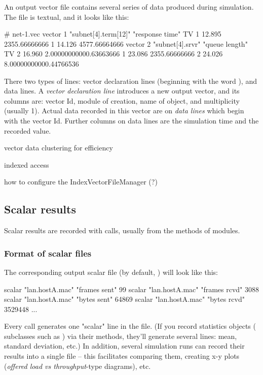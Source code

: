 An output vector file contains several
series of data produced during simulation. The file is textual, and it
looks like this:

\begin{filelisting}
# net-1.vec
vector 1   "subnet[4].term[12]"  "response time"  TV
1  12.895  2355.66666666
1  14.126  4577.66664666
vector 2   "subnet[4].srvr"  "queue length"  TV
2  16.960  2.00000000000.63663666
1  23.086  2355.66666666
2  24.026  8.00000000000.44766536
\end{filelisting}

There two types of lines: vector declaration lines (beginning with
the word ), and data lines.
A \textit{vector declaration line} introduces a new output vector, and
its columns are: vector Id, module of creation, name of 
object, and multiplicity (usually 1). Actual data recorded in this
vector are on \textit{data lines} which begin with the vector Id.
Further columns on data lines are the simulation time and the recorded value.

vector data clustering for efficiency

indexed access

how to configure the IndexVectorFileManager (?)


\subsection{Scalar results}
\label{sec:ch-ana-sim:output-scalars}

Scalar results are recorded with  calls,
usually from the  methods of modules.


\subsubsection{Format of scalar files}

The corresponding output scalar file (by default, )
will look like this:

\begin{filelisting}
scalar "lan.hostA.mac" "frames sent"                99
scalar "lan.hostA.mac" "frames rcvd"                3088
scalar "lan.hostA.mac" "bytes sent"                 64869
scalar "lan.hostA.mac" "bytes rcvd"                 3529448
...
\end{filelisting}

Every  call generates one "scalar" line in the file.
(If you record statistics objects ( subclasses
such as ) via their  methods,
they'll generate several lines: mean, standard deviation, etc.)
In addition, several simulation runs can record their results into a single file --
this facilitates comparing them, creating x-y plots
(\textit{offered load vs throughput}-type diagrams), etc.



